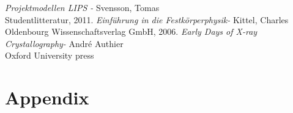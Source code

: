 \documentclass[a4paper,12pt]{article}
\begin{document}
% 
\newpage

\begin{thebibliography}{99}
\textit{Projektmodellen LIPS - } Svensson, Tomas
\\Studentlitteratur, 2011.
\textit{Einführung in die Festkörperphysik- } Kittel, Charles
\\Oldenbourg Wissenschaftsverlag GmbH, 2006.
\textit{Early Days of X-ray Crystallography-} André Authier\\
Oxford University press
\end{thebibliography}
\newpage
\appendix
\section{Appendix}
\label{LetterOA}

\subsection{}
\end{document}
